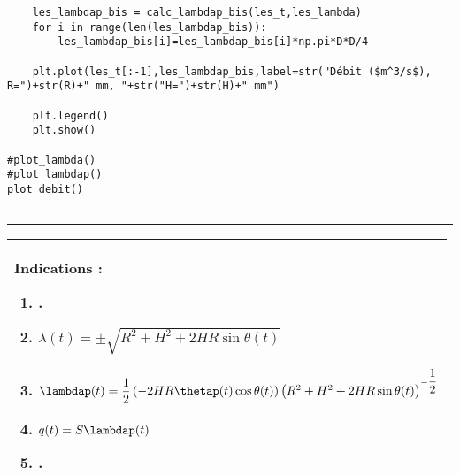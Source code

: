 \begin{lstlisting}
    les_lambdap_bis = calc_lambdap_bis(les_t,les_lambda)
    for i in range(len(les_lambdap_bis)):
        les_lambdap_bis[i]=les_lambdap_bis[i]*np.pi*D*D/4

    plt.plot(les_t[:-1],les_lambdap_bis,label=str("Débit ($m^3/s$), R=")+str(R)+" mm, "+str("H=")+str(H)+" mm")

    plt.legend()
    plt.show()
    
#plot_lambda()
#plot_lambdap()
plot_debit()


\end{lstlisting}
\noindent\hrule

\else
\fi




\ifprof
\else
\footnotesize
\ifcolle
\else
\begin{marginfigure}
\begin{tabular}{|p{.9\linewidth}|}
\hline
Indications :
\begin{enumerate}
\item .
\item $\lambda(t) = \pm\sqrt{ R^2  +H^2 +2 HR\sin\theta(t)}$
\item $\lambdap(t) = \dfrac{1}{2}\left(-  2 HR\thetap(t)\cos\theta(t)\right)\left(R^2  +H^2 +2 HR\sin\theta(t)\right)^{-\dfrac{1}{2}}$
\item $q(t)=S\lambdap(t)$
\item .
\end{enumerate} \\ \hline
\end{tabular}
\end{marginfigure}
\fi
\normalsize


\fi